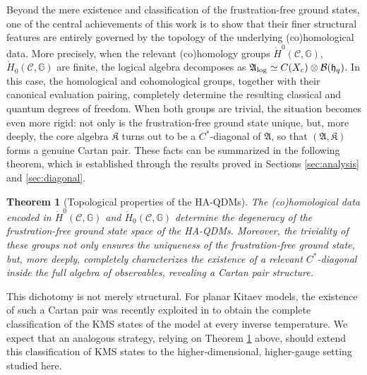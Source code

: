 \documentclass[a4paper,12pt,twoside,reqno]{amsart}
\theoremstyle{plain}
\newtheorem{teo}{Theorem}[section]
\theoremstyle{definition}
\theoremstyle{remark}
\numberwithin{equation}{section}
\numberwithin{figure}{section}
\numberwithin{table}{section}
\newcommand{\f}[1]{\mathcal{#1}}
\newcommand{\n}[1]{\mathbb{#1}}
\begin{document}
	\medskip
	
	
	Beyond the mere existence and classification of the frustration-free ground states, one of the central achievements of this work is to show that their finer structural features are entirely governed by the topology of the underlying (co)homological data. More precisely, when the relevant (co)homology groups $\mathring{H}^0(\f{C},\n{G})$,  $\mathring{H}_0(\f{C},\n{G})$ are finite, the logical algebra decomposes as $\mathfrak{A}_{\rm log}\simeq C(X_c)\otimes\mathcal{B}(\mathfrak{h}_q)$. In this case, the homological and cohomological groups, together with their canonical evaluation pairing, completely determine the resulting classical and quantum degrees of freedom. When both groups are trivial, the situation becomes even more rigid: not only is the frustration-free ground state unique, but, more deeply, the core algebra $\mathfrak{K}$ turns out to be a $C^*$-diagonal of $\mathfrak{A}$, so that $(\mathfrak{A},\mathfrak{K})$ forms a genuine Cartan pair. These facts can be summarized in the following theorem, which is established through the results proved in  Sections \ref{sec:analysis} and \ref{sec:diagonal}.
	
	\begin{teo}[Topological properties of the HA-QDMs]\label{teo:topological_char} 
		The (co)homological data encoded in $\mathring{H}^0(\f{C},\n{G})$ and $\mathring{H}_0(\f{C},\n{G})$ determine the degeneracy of the frustration-free ground state space of the HA-QDMs. Moreover, the triviality of these groups not only ensures the uniqueness of the frustration-free ground state, but, more deeply, completely characterizes the existence of a relevant $C^*$-diagonal inside the full algebra of observables, revealing a Cartan pair structure.
	\end{teo}
	
	This dichotomy is not merely structural. For planar Kitaev models, the existence of such a Cartan pair was recently exploited in \cite{PoloOjitoProdan2026} to obtain the complete classification of the KMS states of the model at every inverse temperature. We expect that an analogous strategy, relying on Theorem \ref{teo:topological_char} above, should extend this classification of KMS states to the higher-dimensional, higher-gauge setting studied here.
	
	\medskip
	
\end{document}

